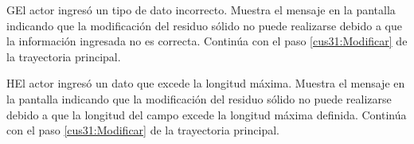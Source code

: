         \begin{UCtrayectoriaA}{G}{El actor ingresó un tipo de dato incorrecto.}    
    \UCpaso[\UCsist] Muestra el mensaje  en la pantalla  indicando que la modificación del residuo sólido no puede realizarse debido a que la información ingresada no es correcta.
    \UCpaso[] Continúa con el paso \ref{cus31:Modificar} de la trayectoria principal.     
    \end{UCtrayectoriaA}
    
            \begin{UCtrayectoriaA}{H}{El actor ingresó un dato que excede la longitud máxima.}    
    \UCpaso[\UCsist] Muestra el mensaje  en la pantalla  indicando que la modificación del residuo sólido no puede realizarse debido a que la longitud del campo excede la longitud máxima definida.
    \UCpaso[] Continúa con el paso \ref{cus31:Modificar} de la trayectoria principal.     
    \end{UCtrayectoriaA}
